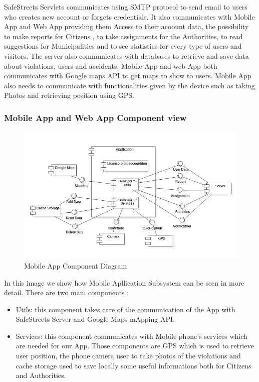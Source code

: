 SafeStreets Servlets communicates using SMTP protocol to send email to users who creates new account or forgets credentials. It also communicates with Mobile App and Web App providing them Access to their acoount data, the possibility to make reports for Citizens , to take assignments for the Authorities, to read suggestions for Municipalities and to see statistics for every type of users and visitors.
The server also communicates with databases to retrieve and save data about violations, users and accidents.
Mobile App and web App both communicates with Google maps API  to get maps to show to users. Mobile App also needs to communicate with functionalities given by the device such as taking Photos and retrieving position using GPS.
\subsubsection{Mobile App and Web App  Component view}
\begin{figure}[H]
\centering
\includegraphics{Images/MobileApplicationComponent.png}
\caption{\label{fig:ComWI} Mobile App Component Diagram}
\end{figure}
In this image we show how Mobile Apllication Subsystem can be seen in more detail.
There are two main components : 
\begin{itemize}
\item Utils:  this component takes care of the communication of the App with SafeStreets Server and Google Maps mApping API.
\item Services: this component communicates with Mobile phone's services which are needed for our App. Those components are GPS which is used to retrieve user position, the phone camera user to take photos of the violations and cache storage used to save locally some useful informations both for Citizens and Authorities.
\end{itemize}
